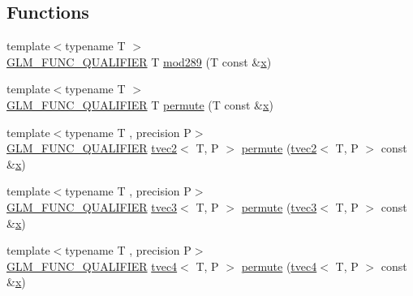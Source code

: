 \subsection*{Functions}
\begin{DoxyCompactItemize}
\item 
{\footnotesize template$<$typename T $>$ }\\\mbox{\hyperlink{setup_8hpp_a33fdea6f91c5f834105f7415e2a64407}{G\+L\+M\+\_\+\+F\+U\+N\+C\+\_\+\+Q\+U\+A\+L\+I\+F\+I\+ER}} T \mbox{\hyperlink{namespaceglm_1_1detail_a9968154b610b2b78f492b2f7babd728c}{mod289}} (T const \&\mbox{\hyperlink{glad_8h_a92d0386e5c19fb81ea88c9f99644ab1d}{x}})
\item 
{\footnotesize template$<$typename T $>$ }\\\mbox{\hyperlink{setup_8hpp_a33fdea6f91c5f834105f7415e2a64407}{G\+L\+M\+\_\+\+F\+U\+N\+C\+\_\+\+Q\+U\+A\+L\+I\+F\+I\+ER}} T \mbox{\hyperlink{namespaceglm_1_1detail_adce908e01ac22b5e55c29bacbf6a37a5}{permute}} (T const \&\mbox{\hyperlink{glad_8h_a92d0386e5c19fb81ea88c9f99644ab1d}{x}})
\item 
{\footnotesize template$<$typename T , precision P$>$ }\\\mbox{\hyperlink{setup_8hpp_a33fdea6f91c5f834105f7415e2a64407}{G\+L\+M\+\_\+\+F\+U\+N\+C\+\_\+\+Q\+U\+A\+L\+I\+F\+I\+ER}} \mbox{\hyperlink{structglm_1_1tvec2}{tvec2}}$<$ T, P $>$ \mbox{\hyperlink{namespaceglm_1_1detail_a26fe45c3293693793c82e9865fa5d2ea}{permute}} (\mbox{\hyperlink{structglm_1_1tvec2}{tvec2}}$<$ T, P $>$ const \&\mbox{\hyperlink{glad_8h_a92d0386e5c19fb81ea88c9f99644ab1d}{x}})
\item 
{\footnotesize template$<$typename T , precision P$>$ }\\\mbox{\hyperlink{setup_8hpp_a33fdea6f91c5f834105f7415e2a64407}{G\+L\+M\+\_\+\+F\+U\+N\+C\+\_\+\+Q\+U\+A\+L\+I\+F\+I\+ER}} \mbox{\hyperlink{structglm_1_1tvec3}{tvec3}}$<$ T, P $>$ \mbox{\hyperlink{namespaceglm_1_1detail_a79bd7b1e8eeb2a6914389d3fbece3956}{permute}} (\mbox{\hyperlink{structglm_1_1tvec3}{tvec3}}$<$ T, P $>$ const \&\mbox{\hyperlink{glad_8h_a92d0386e5c19fb81ea88c9f99644ab1d}{x}})
\item 
{\footnotesize template$<$typename T , precision P$>$ }\\\mbox{\hyperlink{setup_8hpp_a33fdea6f91c5f834105f7415e2a64407}{G\+L\+M\+\_\+\+F\+U\+N\+C\+\_\+\+Q\+U\+A\+L\+I\+F\+I\+ER}} \mbox{\hyperlink{structglm_1_1tvec4}{tvec4}}$<$ T, P $>$ \mbox{\hyperlink{namespaceglm_1_1detail_a06a762db6f033766a27a266d5d120105}{permute}} (\mbox{\hyperlink{structglm_1_1tvec4}{tvec4}}$<$ T, P $>$ const \&\mbox{\hyperlink{glad_8h_a92d0386e5c19fb81ea88c9f99644ab1d}{x}})

\end{DoxyCompactItemize}
